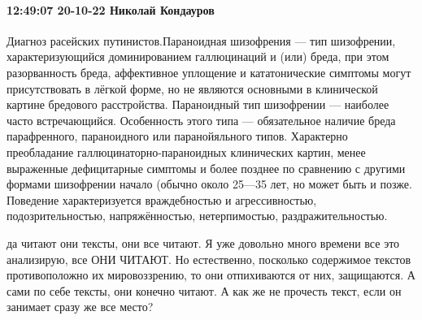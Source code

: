  
 
 
 
 

\paragraph{12:49:07 20-10-22 Николай Кондауров}

Диагноз расейских путинистов.Парано‌идная шизофрени‌я — тип
шизофрении, характеризующийся доминированием галлюцинаций и (или) бреда, при
этом разорванность бреда, аффективное уплощение и кататонические симптомы могут
присутствовать в лёгкой форме, но не являются основными в клинической картине
бредового расстройства. Параноидный тип шизофрении — наиболее часто
встречающийся. Особенность этого типа — обязательное наличие бреда
парафренного, параноидного или паранойяльного типов. Характерно преобладание
галлюцинаторно-параноидных клинических картин, менее выраженные дефицитарные
симптомы и более позднее по сравнению с другими формами шизофрении начало
(обычно около 25—35 лет, но может быть и позже. Поведение характеризуется
враждебностью и агрессивностью, подозрительностью, напряжённостью,
нетерпимостью, раздражительностью.




да читают они тексты, они все читают. Я уже довольно много времени все это
анализирую, все ОНИ ЧИТАЮТ. Но естественно, посколько содержимое текстов
противоположно их мировоззрению, то они отпихиваются от них, защищаются. А сами
по себе тексты, они конечно читают. А как же не прочесть текст, если он
занимает сразу же все место?

